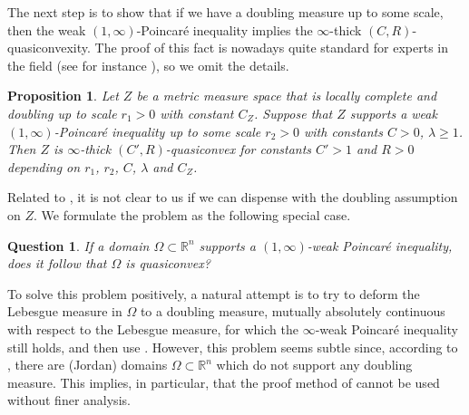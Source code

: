 \documentclass[reqno]{amsart}
\numberwithin{equation}{section}
\newtheorem{proposition}[theorem]{Proposition}
\newtheorem{question}[theorem]{Question}
\theoremstyle{remark}
\newcommand{\R}{\mathbb{R}}
\begin{document}
The next step is to show that if we have a doubling measure up to some scale, then the weak $(1,\infty)$-Poincaré inequality implies the $\infty$-thick $(C,R)$-quasiconvexity. The proof of this fact is nowadays quite standard for experts in the field (see for instance \cite[Proposition 4.3]{Durand_2}), so we omit the details. %

\begin{proposition}\label{prop:quasiconvexity_2}
    Let $Z$ be a metric measure space that is locally complete and doubling up to scale $r_1>0$ with constant $C_{Z}$. Suppose that $Z$ supports a weak $(1,\infty)$-Poincaré inequality up to some scale $r_2>0$ with constants $C>0$, $\lambda\geq 1$. Then $Z$ is $\infty$-thick $(C',R)$-quasiconvex for constants $C'>1$ and $R>0$ depending on $r_1$, $r_2$, $C$,  $\lambda$ and $C_Z$.
\end{proposition}


Related to , it is not clear to us if we can dispense with the doubling assumption on $Z$. We formulate the problem as the following special case.


\begin{question}\label{ques:PI}
If a domain $\Omega\subset\R^n$ supports a $(1,\infty)$-weak Poincaré inequality, does it follow that $\Omega$ is quasiconvex?
\end{question}

To solve this problem positively, a natural attempt is to try to deform the Lebesgue measure in $\Omega$ to a doubling measure, mutually absolutely continuous with respect to the Lebesgue measure, for which the $\infty$-weak Poincaré inequality still holds, and then use . However, this problem seems subtle since, according to \cite{Saks:99}, there are (Jordan) domains $\Omega \subset \mathbb{R}^{n}$ which do not support any doubling measure. This implies, in particular, that the proof method of  cannot be used without finer analysis.
\end{document}
